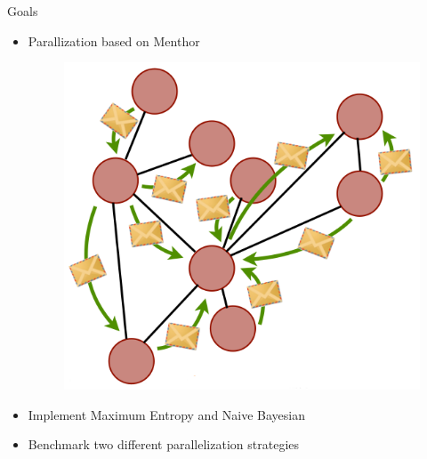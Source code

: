 \documentclass{beamer}
\begin{document}
\begin{frame}{Goals}

\begin{itemize}
 \item Parallization based on Menthor\citep{oai:infoscience.epfl.ch:165111}

\begin{figure}[!htb]
  \centering
  \includegraphics[scale=0.20]{presentation/Menthor.png}
\end{figure}

 \item Implement Maximum Entropy\citep{berger_a1-etal:1996a} and Naive Bayesian\citep{Rennie03}
 \item Benchmark two different parallelization strategies
\end{itemize}

\end{frame}

\end{document}
